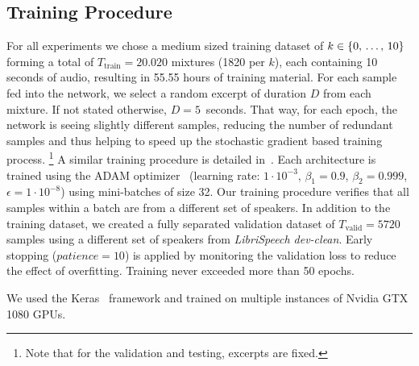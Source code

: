 \subsection{Training Procedure}%
\label{ssec:parameters}
For all experiments we chose a medium sized training dataset of \(k \in \textrm{\{0, \ldots, 10\}}\) forming a total of \(T_{\textrm{train}} = 20.020\) mixtures  (1820 per \(k\)), each containing 10 seconds of audio, resulting in 55.55 hours of training material.
For each sample fed into the network, we select a random excerpt of duration \(D\) from each mixture. If not stated otherwise, \(D=5\)~seconds.
That way, for each epoch, the network is seeing slightly different samples, reducing the number of redundant samples and thus helping to speed up the stochastic gradient based training process.
\footnote{Note that for the validation and testing, excerpts are fixed.}
A similar training procedure is detailed in~\cite{schluter16, stoeter17}.
Each architecture is trained using the ADAM optimizer~\cite{kingma14} (learning rate: \(1 \cdot 10^{-3}\), \(\beta_1=0.9\), \(\beta_2=0.999\), \(\epsilon=1 \cdot 10^{-8}\)) using mini-batches of size 32.
Our training procedure verifies that all samples within a batch are from a different set of speakers.
In addition to the training dataset, we created a fully separated validation dataset of \(T_{\textrm{valid}} = 5720\) samples using a different set of speakers from \emph{LibriSpeech dev-clean}.
Early stopping (\(patience = 10\)) is applied by monitoring the validation loss to reduce the effect of overfitting.
Training never exceeded more than 50 epochs.
\par
We used the Keras~\cite{chollet2015keras} framework and trained on multiple instances of Nvidia GTX 1080 GPUs.

